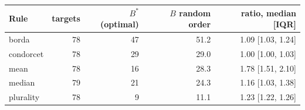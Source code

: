 \begin{tabular}{@{}lrrrr@{}}\toprule
Rule & targets & $B^\ast$ (optimal) & $B$ random order & ratio, median [IQR]\\\midrule
borda & 78 & 47 & 51.2 & 1.09 [1.03, 1.24]\\
condorcet & 78 & 29 & 29.0 & 1.00 [1.00, 1.03]\\
mean & 78 & 16 & 28.3 & 1.78 [1.51, 2.10]\\
median & 79 & 21 & 24.3 & 1.16 [1.03, 1.38]\\
plurality & 78 & 9 & 11.1 & 1.23 [1.22, 1.26]\\
\bottomrule\end{tabular}
